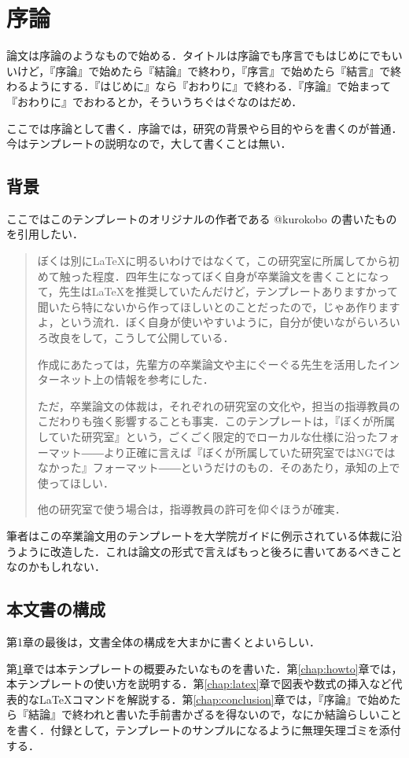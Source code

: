 \chapter{序論}
\label{chap:introduction}

論文は序論のようなもので始める．タイトルは序論でも序言でもはじめにでもいいけど，『序論』で始めたら『結論』で終わり，『序言』で始めたら『結言』で終わるようにする．『はじめに』なら『おわりに』で終わる．『序論』で始まって『おわりに』でおわるとか，そういうちぐはぐなのはだめ．

ここでは序論として書く．序論では，研究の背景やら目的やらを書くのが普通．今はテンプレートの説明なので，大して書くことは無い．


\section{背景}

ここではこのテンプレートのオリジナルの作者である @kurokobo の書いたもの\cite{kurokobo10}を引用したい．

\begin{quotation}
ぼくは別に\LaTeX に明るいわけではなくて，この研究室に所属してから初めて触った程度．四年生になってぼく自身が卒業論文を書くことになって，先生は\LaTeX を推奨していたんだけど，テンプレートありますかって聞いたら特にないから作ってほしいとのことだったので，じゃあ作りますよ，という流れ．ぼく自身が使いやすいように，自分が使いながらいろいろ改良をして，こうして公開している．

作成にあたっては，先輩方の卒業論文や主にぐーぐる先生を活用したインターネット上の情報を参考にした．

ただ，卒業論文の体裁は，それぞれの研究室の文化や，担当の指導教員のこだわりも強く影響することも事実．このテンプレートは，『ぼくが所属していた研究室』という，ごくごく限定的でローカルな仕様に沿ったフォーマット――より正確に言えば『ぼくが所属していた研究室ではNGではなかった』フォーマット――というだけのもの．そのあたり，承知の上で使ってほしい．

他の研究室で使う場合は，指導教員の許可を仰ぐほうが確実．
\end{quotation}

筆者はこの卒業論文用のテンプレートを大学院ガイドに例示されている体裁\cite{mag_guide12}に沿うように改造した．これは論文の形式で言えばもっと後ろに書いてあるべきことなのかもしれない．

\section{本文書の構成}

第1章の最後は，文書全体の構成を大まかに書くとよいらしい．

第\ref{chap:introduction}章では本テンプレートの概要みたいなものを書いた．第\ref{chap:howto}章では，本テンプレートの使い方を説明する．第\ref{chap:latex}章で図表や数式の挿入など代表的な\LaTeX コマンドを解説する．第\ref{chap:conclusion}章では，『序論』で始めたら『結論』で終われと書いた手前書かざるを得ないので，なにか結論らしいことを書く．付録として，テンプレートのサンプルになるように無理矢理ゴミを添付する．
